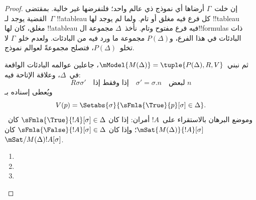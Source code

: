 \documentclass[../../../include/open-logic-section]{subfiles}
\begin{document}
\begin{proof}
إن خلت~$\Gamma$ أرضاها أي نموذج ذي عالم واحد؛ فلنفرضها غير خالية.
بمقتضى القضية يوجد لـ~$\Gamma$ !!a{tableau} كل فرع فيه مغلق أو تام. ولما لم يوجد
لها !!{tableau} مغلق، كان لها !!a{tableau} فيه فرع مفتوح وتام.
نأخذ~$\Delta$ مجموعة ال!!{formula}s ذات البادئات في هذا الفرع،
و$P(\Delta)$ مجموعة ما ورد فيه من البادئات.
ولعدم خلو~$\Gamma$ لا تخلو~$P(\Delta)$، فتصلح مجموعةً لعوالم نموذج.

ثم نبني~$\mModel{M(\Delta)} = \tuple{P(\Delta), R, V}$، جاعلين
عوالمه البادئات الواقعة في~$\Delta$، وعلاقة الإتاحة فيه:
\[
R\sigma\sigma' \quad \text{إذا وفقط إذا} \quad
\sigma'=\sigma.n \quad \text{لبعض~$n$}
\]
ويُعطى إسناده بـ
\[
V(p) = \Setabs{\sigma}{\sFmla{\True}{p}[\sigma] \in \Delta}.
\]
وموضع البرهان بالاستقراء على~$!A$ أمران: إذا كان
$\sFmla{\True}{!A}[\sigma] \in
\Delta$ كان~$\mSat{M(\Delta)}{!A}[\sigma]$؛ وإذا كان
$\sFmla{\False}{!A}[\sigma] \in \Delta$ كان
$\mSat/{M(\Delta)}{!A}[\sigma]$.

\begin{enumerate}
  \item {}
  \item {}
  \item {}
\end{enumerate}
\end{proof}
\end{document}
